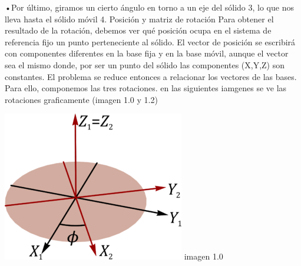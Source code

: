 \documentclass[10pt,a4paper]{article}
\begin{document}
  •Por último, giramos un cierto ángulo  en torno a un eje del sólido 3, lo que nos lleva hasta el sólido móvil 4.
\Large Posición y matriz de rotación
Para obtener el resultado de la rotación, debemos ver qué posición ocupa en el sistema de referencia fijo un punto perteneciente al sólido. El vector de posición se escribirá con componentes diferentes en la base fija y en la base móvil, aunque el vector sea el mismo
donde, por ser un punto del sólido las componentes (X,Y,Z) son constantes. El problema se reduce entonces a relacionar los vectores de las bases. Para ello, componemos las tres rotaciones. en las siguientes iamgenes se ve las rotaciones graficamente (imagen 1.0 y 1.2)
\begin{center}
\includegraphics[scale=3.2]{imagenes/Angulos.png} imagen 1.0
\end{center}
\end{document}
